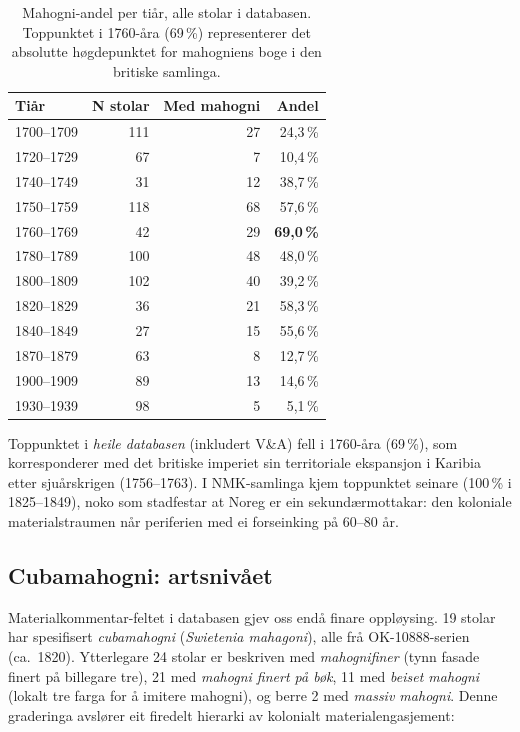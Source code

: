\documentclass[10pt, a4paper, twocolumn]{article}
\begin{document}
\begin{table}[H]
\centering
\caption{Mahogni-andel per tiår, alle stolar i databasen. Toppunktet i 1760-åra (69\,\%) representerer det absolutte høgdepunktet for mahogniens boge i den britiske samlinga.}
\label{tab:decade}
\begin{tabular}{@{}lrrr@{}}
\toprule
\textbf{Tiår} & \textbf{N stolar} & \textbf{Med mahogni} & \textbf{Andel} \\
\midrule
1700--1709 & 111 & 27 & 24,3\,\% \\
1720--1729 &  67 &  7 & 10,4\,\% \\
1740--1749 &  31 & 12 & 38,7\,\% \\
1750--1759 & 118 & 68 & 57,6\,\% \\
1760--1769 &  42 & 29 & \textbf{69,0\,\%} \\
1780--1789 & 100 & 48 & 48,0\,\% \\
1800--1809 & 102 & 40 & 39,2\,\% \\
1820--1829 &  36 & 21 & 58,3\,\% \\
1840--1849 &  27 & 15 & 55,6\,\% \\
1870--1879 &  63 &  8 & 12,7\,\% \\
1900--1909 &  89 & 13 & 14,6\,\% \\
1930--1939 &  98 &  5 &  5,1\,\% \\
\bottomrule
\end{tabular}
\end{table}

Toppunktet i \emph{heile databasen} (inkludert V\&A) fell i 1760-åra (69\,\%), som korresponderer med det britiske imperiet sin territoriale ekspansjon i Karibia etter sjuårskrigen (1756--1763). I NMK-samlinga kjem toppunktet seinare (100\,\% i 1825--1849), noko som stadfestar at Noreg er ein sekundærmottakar: den koloniale materialstraumen når periferien med ei forseinking på 60--80 år.

\subsection{Cubamahogni: artsnivået}

Materialkommentar-feltet i databasen gjev oss endå finare oppløysing. 19 stolar har spesifisert \emph{cubamahogni} (\emph{Swietenia mahagoni}), alle frå OK-10888-serien (ca.\ 1820). Ytterlegare 24 stolar er beskriven med \emph{mahognifiner} (tynn fasade finert på billegare tre), 21 med \emph{mahogni finert på bøk}, 11 med \emph{beiset mahogni} (lokalt tre farga for å imitere mahogni), og berre 2 med \emph{massiv mahogni}. Denne graderinga avslører eit firedelt hierarki av kolonialt materialengasjement:
\end{document}
